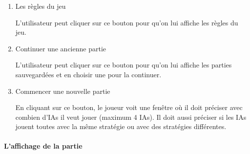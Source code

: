 \documentclass[11pt, letterpaper]{article}
\begin{document}
\begin{enumerate}

 \item  {Les règles du jeu}
 
  L'utilisateur peut cliquer sur ce bouton pour qu'on lui affiche les règles du jeu.\\


 \item  {Continuer une ancienne partie}
 
 L'utilisateur peut cliquer sur ce bouton pour qu'on lui affiche les parties sauvegardées et en choisir une pour la continuer.\\

 
 \item  {Commencer une nouvelle partie}

En cliquant sur ce bouton, le joueur voit une fenêtre où il doit préciser avec combien d'IAs il veut jouer (maximum 4 IAs). Il doit aussi préciser si les IAs jouent toutes avec la même stratégie ou avec des stratégies différentes.

\end{enumerate}

\paragraph{L'affichage de la partie}
\end{document}

